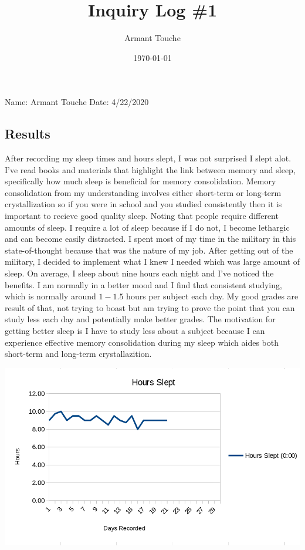 \documentclass[a4paper,man,biblatex]{apa6}
\title{Inquiry Log \#1}
\author{Armant Touche}
\affiliation{Portland State University}
\date{\today}
\begin{document}
\thispagestyle{otherpage}
\setcounter{biburllcpenalty}{7000}
\setcounter{biburlucpenalty}{8000}


\noindent Name: Armant Touche\newline
\noindent Date: 4/22/2020

\subsection{Results}

After recording my sleep times and hours slept, I was not surprised I slept alot. I've read books and materials that highlight the link between memory and sleep, specifically how much sleep is beneficial for memory consolidation. Memory consolidation from my understanding involves either short-term or long-term crystallization so if you were in school and you studied consistently then it is important to recieve good quality sleep. Noting that people require different amounts of sleep. I require a lot of sleep because if I do not, I become lethargic and can become easily distracted. I spent most of my time in the military in this state-of-thought because that was the nature of my job. After getting out of the military, I decided to implement what I knew I needed which was large amount of sleep. On average, I sleep about nine hours each night and I've noticed the benefits. I am normally in a better mood and I find that consistent studying, which is normally around $1-1.5$ hours per subject each day. My good grades are result of that, not trying to boast but am trying to prove the point that you can study less each day and potentially make better grades. The motivation for getting better sleep is I have to study less about a subject because I can experience effective memory consolidation during my sleep which aides both short-term and long-term crystallazition.

\includegraphics[width=.75\linewidth]{hours_slept}
\end{document}
